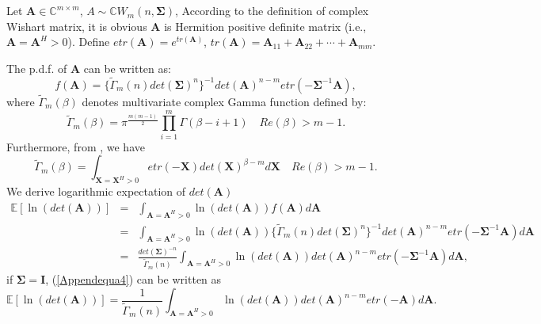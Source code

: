 \documentclass[12pt, draftclsnofoot, onecolumn]{IEEEtran}
\begin{document}
\appendices
\section{}\label{log expectation of OM}
Let $\mathbf{A}\in \mathbb{C}^{m\times m}$, $A\sim \mathbb{C}W_{m}(n, \mathbf{\Sigma})$, According to the definition of complex Wishart matrix, it is obvious $\mathbf{A}$ is Hermition positive definite matrix (i.e., $\mathbf{A}=\mathbf{A}^{H}>0$). Define $etr(\mathbf{A})=e^{tr(\mathbf{A})}$, $tr(\mathbf{A})=\mathbf{A}_{11}+\mathbf{A}_{22}+\cdots+\mathbf{A}_{mm}$.

The p.d.f. of $\mathbf{A}$ can be written as\cite{nagar2011expectations}:
\begin{equation}
f(\mathbf{A})=\{\tilde{\Gamma}_{m}(n)det(\mathbf{\Sigma})^{n} \}^{-1}det(\mathbf{A})^{n-m}etr(-\mathbf{\Sigma}^{-1}\mathbf{A}),
\label{Appendequa1}
\end{equation}
where $\tilde{\Gamma}_{m}(\beta)$ denotes multivariate complex Gamma function defined by\cite{nagar2011expectations}:
\begin{equation}
\tilde{\Gamma}_{m}(\beta)=\pi^{\frac{m(m-1)}{2}}\prod_{i=1}^{m}\Gamma(\beta-i+1)\quad Re(\beta)>m-1.
\label{Appendequa2}
\end{equation}
Furthermore, from \cite{nagar2011expectations}, we have 
\begin{equation}
\tilde{\Gamma}_{m}(\beta)=\int_{\mathbf{X}=\mathbf{X}^{H}>0}etr(-\mathbf{X})det(\mathbf{X})^{\beta-m}d
\mathbf{X} \quad Re(\beta)>m-1.
\label{Appendequa3}
\end{equation}
We derive logarithmic expectation of $det(\mathbf{A})$
\begin{eqnarray}
\nonumber
\mathbb{E}[\ln(det(\mathbf{A}))]&=&\int_{\mathbf{A}=\mathbf{A}^{H}>0}\ln(det(\mathbf{A}))f(\mathbf{A})d\mathbf{A}\\
\nonumber
&=&\int_{\mathbf{A}=\mathbf{A}^{H}>0}\ln(det(\mathbf{A}))\{\tilde{\Gamma}_{m}(n)det(\mathbf{\Sigma})^{n} \}^{-1}det(\mathbf{A})^{n-m}etr(-\mathbf{\Sigma}^{-1}\mathbf{A})d\mathbf{A}\\
&=&\frac{det(\mathbf{\Sigma})^{-n}}{\tilde{\Gamma}_{m}(n)}\int_{\mathbf{A}=\mathbf{A}^{H}>0}\ln(det(\mathbf{A}))det(\mathbf{A})^{n-m}etr(-\mathbf{\Sigma}^{-1}\mathbf{A})d\mathbf{A},
\label{Appendequa4}
\end{eqnarray}
if $\mathbf{\Sigma}=\mathbf{I}$, (\ref{Appendequa4}) can be written as 
\begin{equation}
\mathbb{E}[\ln(det(\mathbf{A}))]=\frac{1}{\tilde{\Gamma}_{m}(n)}\int_{\mathbf{A}=\mathbf{A}^{H}>0}\ln(det(\mathbf{A}))det(\mathbf{A})^{n-m}etr(-\mathbf{A})d\mathbf{A}.
\label{Appendequa5}
\end{equation}
\end{document}
